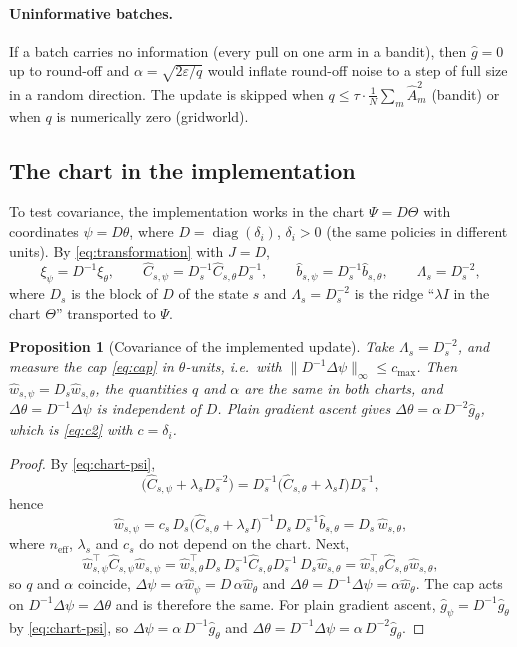 \documentclass[11pt,a4paper]{article}
\numberwithin{equation}{section}
\theoremstyle{plain}
\newtheorem{proposition}[theorem]{Proposition}
\theoremstyle{definition}
\theoremstyle{remark}
\newcommand{\T}{^{\top}}
\DeclareMathOperator{\diag}{diag}
\begin{document}
\paragraph{Uninformative batches.}
If a batch carries no information (every pull on one arm in a bandit), then $\hat g=0$ up to round-off and $\alpha=\sqrt{2\varepsilon/q}$ would inflate round-off noise to a step of full size in a random direction.
The update is skipped when $q\le\tau\cdot\frac1N\sum_m\hat A_m^2$ (bandit) or when $q$ is numerically zero (gridworld).

\subsection{The chart in the implementation}\label{sec:chart-impl}

To test covariance, the implementation works in the chart $\Psi=D\Theta$ with coordinates $\psi=D\theta$, where $D=\diag(\delta_i)$, $\delta_i>0$ (the same policies in different units). By \eqref{eq:transformation} with $J=D$,
\begin{equation}\label{eq:chart-psi}
  \xi_\psi=D^{-1}\xi_\theta,\qquad
  \hat C_{s,\psi}=D_s^{-1}\hat C_{s,\theta}D_s^{-1},\qquad
  \hat b_{s,\psi}=D_s^{-1}\hat b_{s,\theta},\qquad
  \Lambda_s=D_s^{-2},
\end{equation}
where $D_s$ is the block of $D$ of the state $s$ and $\Lambda_s=D_s^{-2}$ is the ridge ``$\lambda I$ in the chart $\Theta$'' transported to $\Psi$.

\begin{proposition}[Covariance of the implemented update]\label{prop:covariance-impl}
Take $\Lambda_s=D_s^{-2}$, and measure the cap \eqref{eq:cap} in $\theta$-units, i.e.\ with $\|D^{-1}\Delta\psi\|_\infty\le c_{\max}$. Then $\hat w_{s,\psi}=D_s\hat w_{s,\theta}$, the quantities $q$ and $\alpha$ are the same in both charts, and
$\Delta\theta=D^{-1}\Delta\psi$ is independent of $D$. Plain gradient ascent gives $\Delta\theta=\alpha\,D^{-2}\hat g_\theta$, which is \eqref{eq:c2} with $c=\delta_i$.
\end{proposition}

\begin{proof}
By \eqref{eq:chart-psi},
\[
  \bigl(\hat C_{s,\psi}+\lambda_sD_s^{-2}\bigr)=D_s^{-1}\bigl(\hat C_{s,\theta}+\lambda_sI\bigr)D_s^{-1},
\]
hence
\[
  \hat w_{s,\psi}=c_s\,D_s\bigl(\hat C_{s,\theta}+\lambda_sI\bigr)^{-1}D_s\,D_s^{-1}\hat b_{s,\theta}=D_s\,\hat w_{s,\theta},
\]
where $n_{\mathrm{eff}}$, $\lambda_s$ and $c_s$ do not depend on the chart. Next,
\[
  \hat w_{s,\psi}\T\hat C_{s,\psi}\hat w_{s,\psi}=\hat w_{s,\theta}\T D_s\,D_s^{-1}\hat C_{s,\theta}D_s^{-1}\,D_s\hat w_{s,\theta}=\hat w_{s,\theta}\T\hat C_{s,\theta}\hat w_{s,\theta},
\]
so $q$ and $\alpha$ coincide, $\Delta\psi=\alpha\hat w_\psi=D\,\alpha\hat w_\theta$ and $\Delta\theta=D^{-1}\Delta\psi=\alpha\hat w_\theta$. The cap acts on $D^{-1}\Delta\psi=\Delta\theta$ and is therefore the same.
For plain gradient ascent, $\hat g_\psi=D^{-1}\hat g_\theta$ by \eqref{eq:chart-psi}, so $\Delta\psi=\alpha\,D^{-1}\hat g_\theta$ and $\Delta\theta=D^{-1}\Delta\psi=\alpha\,D^{-2}\hat g_\theta$.
\end{proof}
\end{document}
